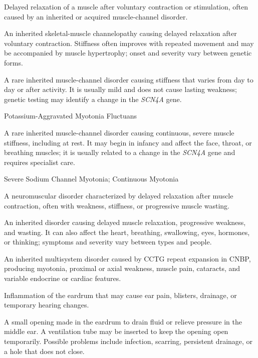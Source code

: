  Delayed relaxation of a muscle after voluntary contraction or stimulation, often caused by an inherited or acquired muscle-channel disorder.

 An inherited skeletal-muscle channelopathy causing delayed relaxation after voluntary
contraction. Stiffness often improves with repeated movement and may be accompanied by
muscle hypertrophy; onset and severity vary between genetic forms.

 A rare inherited muscle-channel disorder causing stiffness that varies from day to day or after activity. It is usually mild and does not cause lasting weakness; genetic testing may identify a change in the \textit{SCN4A} gene.

\synonyms
Potassium-Aggravated Myotonia Fluctuans

 A rare inherited muscle-channel disorder causing continuous, severe muscle stiffness, including at rest. It may begin in infancy and affect the face, throat, or breathing muscles; it is usually related to a change in the \textit{SCN4A} gene and requires specialist care.

\synonyms
Severe Sodium Channel Myotonia; Continuous Myotonia

 A neuromuscular disorder characterized by delayed relaxation after muscle contraction, often with weakness, stiffness, or progressive muscle wasting.

 An inherited disorder causing delayed muscle relaxation, progressive weakness, and wasting. It can also affect the heart, breathing, swallowing, eyes, hormones, or thinking; symptoms and severity vary between types and people.

 An inherited multisystem disorder caused by CCTG repeat expansion in CNBP, producing myotonia, proximal or axial weakness, muscle pain, cataracts, and variable endocrine or cardiac features.

 Inflammation of the eardrum that may cause ear pain, blisters, drainage, or temporary hearing changes.

 A small opening made in the eardrum to drain fluid or relieve pressure in the middle ear. A ventilation tube may be inserted to keep the opening open temporarily. Possible problems include infection, scarring, persistent drainage, or a hole that does not close.

